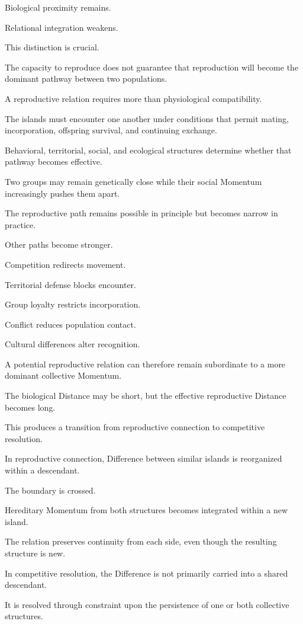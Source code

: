 Biological proximity remains.

Relational integration weakens.

This distinction is crucial.

The capacity to reproduce does not guarantee that reproduction will become the dominant pathway between two populations.

A reproductive relation requires more than physiological compatibility.

The islands must encounter one another under conditions that permit mating, incorporation, offspring survival, and continuing exchange.

Behavioral, territorial, social, and ecological structures determine whether that pathway becomes effective.

Two groups may remain genetically close while their social Momentum increasingly pushes them apart.

The reproductive path remains possible in principle but becomes narrow in practice.

Other paths become stronger.

Competition redirects movement.

Territorial defense blocks encounter.

Group loyalty restricts incorporation.

Conflict reduces population contact.

Cultural differences alter recognition.

A potential reproductive relation can therefore remain subordinate to a more dominant collective Momentum.

The biological Distance may be short, but the effective reproductive Distance becomes long.

This produces a transition from reproductive connection to competitive resolution.

In reproductive connection, Difference between similar islands is reorganized within a descendant.

The boundary is crossed.

Hereditary Momentum from both structures becomes integrated within a new island.

The relation preserves continuity from each side, even though the resulting structure is new.

In competitive resolution, the Difference is not primarily carried into a shared descendant.

It is resolved through constraint upon the persistence of one or both collective structures.

